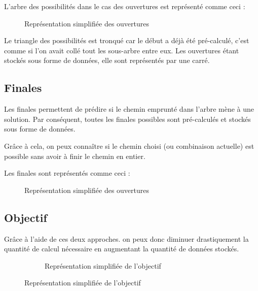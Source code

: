 	L'arbre des possibilités dans le cas des ouvertures est représenté comme ceci :
	
	\begin{figure}[H]
		\begin{center}
				
		\end{center}
		
		\caption{Représentation simplifiée des ouvertures}
		\label{fig:ouvertures}
	\end{figure}
		
	Le triangle des possibilités est tronqué car le début a déjà été pré-calculé, c'est comme si l'on avait collé tout les sous-arbre entre eux. Les ouvertures étant stockés sous forme de données, elle sont représentés par une carré.

	\subsection{Finales}

	Les finales permettent de prédire si le chemin emprunté dans l'arbre mène à une solution. Par conséquent, toutes les finales possibles sont pré-calculés et stockés sous forme de données.
	
	Grâce à cela, on peux connaître si le chemin choisi (ou combinaison actuelle) est possible sans avoir à finir le chemin en entier.
	
	Les finales sont représentés comme ceci :
	
	\begin{figure}[H]
		\begin{center}
				
		\end{center}
		
		\caption{Représentation simplifiée des ouvertures}
		\label{fig:finales}
	\end{figure}
	
	\subsection{Objectif}
	
	Grâce à l'aide de ces deux approches. on peux donc diminuer drastiquement la quantité de calcul nécessaire en augmentant la quantité de données stockés.
	
	\begin{figure}[H]
			\begin{figure}[H]
				\begin{center}
						
				\end{center}
				
				\caption{Représentation simplifiée de l'objectif}
				\label{fig:ouvertures_finales}
			\end{figure}
	\end{figure}
	

